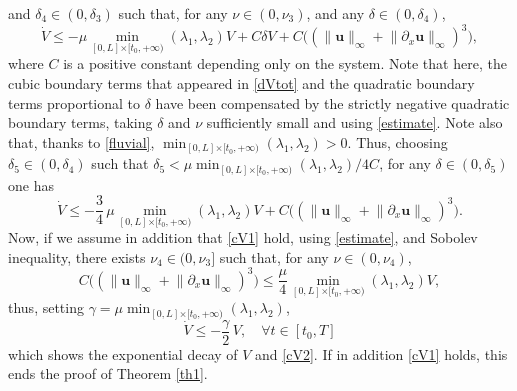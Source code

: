 and $\delta_{4}\in(0,\delta_{3})$
such that, for any $\nu\in(0,\nu_{3})$,
and any $\delta\in(0,\delta_{4})$,
\begin{equation*}
\dot V\leq -\mu\min\limits_{[0,L]{\times[t_{0},+\infty)}}(\lambda_{1},\lambda_{2})V+C\delta V +C\bigl(\left(\lVert\boldsymbol{u}\rVert_{\infty}+\lVert\partial_{x}\boldsymbol{u}\rVert_{\infty}\right)^{{3}} \bigr),
\end{equation*}
where $C$ is a positive constant depending only on the system. Note that here, the cubic boundary terms that appeared in \eqref{dVtot} and the quadratic boundary terms proportional to $\delta$ have been compensated by the strictly negative quadratic boundary terms, taking $\delta$ and $\nu$ sufficiently small and using \eqref{estimate}. Note also that, thanks to \eqref{fluvial}, $\min_{[0,L]{\times[t_{0},+\infty)}}(\lambda_{1},\lambda_{2})>0$. Thus, choosing $\delta_{5}\in(0,\delta_{4})$ such that \hbox{$\delta_{5}<\mu\min_{[0,L]{\times[t_{0},+\infty)}}(\lambda_{1},\lambda_{2})/4C$}, for any $\delta\in(0,\delta_{5})$ one has
\begin{equation*}
\dot V\leq -\frac{3}{4}\,\mu\min\limits_{[0,L]{\times[t_{0},+\infty)}}(\lambda_{1},\lambda_{2})V+C \bigl(\left(\lVert\boldsymbol{u}\rVert_{\infty}+\lVert\partial_{x}\boldsymbol{u}\rVert_{\infty}\right)^{{3}} \bigr).
\end{equation*}
Now, if we assume in addition that \eqref{cV1} hold, using \eqref{estimate}, and Sobolev inequality, there exists $\nu_{4}\in(0,\nu_{3}]$ such that, for any $\nu\in(0,\nu_{4})$,
\begin{equation*}
C \bigl(\left(\lVert\boldsymbol{u}\rVert_{\infty}+\lVert\partial_{x}\boldsymbol{u}\rVert_{\infty}\right)^{{3}} \bigr)\leq \frac{\mu}{4}\min\limits_{[0,L]{\times[t_{0},+\infty)}}(\lambda_{1},\lambda_{2})V,
\end{equation*}
thus, setting $\gamma=\mu\min_{[0,L]{\times[t_{0},+\infty)}}(\lambda_{1},\lambda_{2})$,
\begin{equation*}
\dot V\leq -\frac{\gamma}{2}\, V{,\quad\forall t\in[t_{0},T]}
\end{equation*}
which shows the exponential decay of $V$ and \eqref{cV2}. {If in addition \eqref{cV1} holds, this}
ends the proof of Theorem \ref{th1}.

